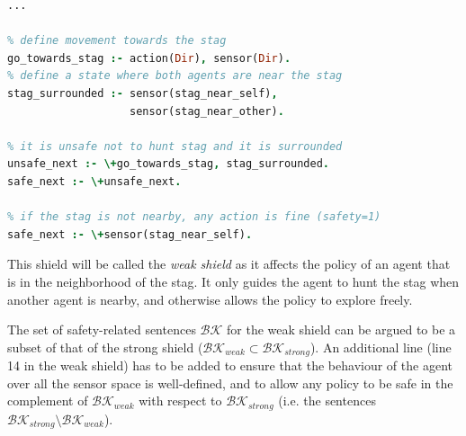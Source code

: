 \begin{lstlisting}[language=Prolog, caption={Weak shield ($\mathcal{T}_{weak}$) for \textit{Markov Stag-Hunt}.}, label={shield:msh_weak}]
% actions & sensors go here
...

% define movement towards the stag
go_towards_stag :- action(Dir), sensor(Dir).
% define a state where both agents are near the stag
stag_surrounded :- sensor(stag_near_self), 
                   sensor(stag_near_other).

% it is unsafe not to hunt stag and it is surrounded
unsafe_next :- \+go_towards_stag, stag_surrounded.
safe_next :- \+unsafe_next.

% if the stag is not nearby, any action is fine (safety=1)
safe_next :- \+sensor(stag_near_self).
\end{lstlisting}

This shield will be called the \textit{weak shield} as it affects the policy of an agent that is in the neighborhood of the stag. It only guides the agent to hunt the stag when another agent is nearby, and otherwise allows the policy to explore freely. 

The set of safety-related sentences $\mathcal{BK}$ for the weak shield can be argued to be a subset of that of the strong shield ($\mathcal{BK}_{weak}\subset\mathcal{BK}_{strong}$). An additional line (line 14 in the weak shield) has to be added to ensure that the behaviour of the agent over all the sensor space is well-defined, and to allow any policy to be safe in the complement of $\mathcal{BK}_{weak}$ with respect to $\mathcal{BK}_{strong}$ (i.e. the sentences $\mathcal{BK}_{strong}\setminus\mathcal{BK}_{weak}$).
